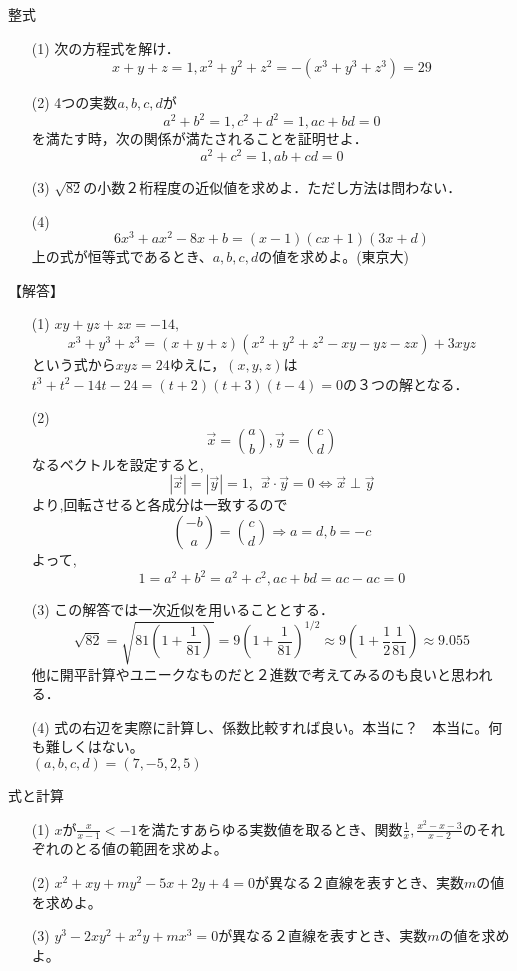 \documentclass[a4paper,fleqn,dvipdfmx]{jsarticle}
\begin{document}
\newpage
\begin{itembox}[l]{整式}
\begin{itemize}
    \item [(1)] 次の方程式を解け．
    $$x+y+z=1,x^2+y^2+z^2=-(x^3+y^3+z^3)=29$$
    \item [(2)] 4つの実数$a,b,c,d$が
    $$a^2+b^2=1,c^2+d^2=1,ac+bd=0$$
    を満たす時，次の関係が満たされることを証明せよ．
    $$a^2+c^2=1,ab+cd=0$$
    \item [(3)] $\sqrt{82}$の小数２桁程度の近似値を求めよ．ただし方法は問わない．
    \item [(4)] $$6x^3+ax^2-8x+b=(x-1)(cx+1)(3x+d)$$
    上の式が恒等式であるとき、$a,b,c,d$の値を求めよ。(東京大)
\end{itemize}
\end{itembox}

\begin{flushleft}
【解答】
\end{flushleft}

\begin{itemize}
    \item [(1)] $xy+yz+zx=-14,$$$x^3+y^3+z^3=(x+y+z)(x^2+y^2+z^2-xy-yz-zx)+3xyz$$という式から$xyz=24$ゆえに，$(x,y,z)$は$t^3+t^2-14t-24=(t+2)(t+3)(t-4)=0$の３つの解となる．
    \item [(2)]  $$\overrightarrow{ x }= { a \choose b }  , \overrightarrow{ y }= { c \choose d }  $$
なるベクトルを設定すると,$$ \left| \overrightarrow{ x } \right|=\left| \overrightarrow{ y } \right|=1,\hspace{5pt}   \overrightarrow{ x }\cdot \overrightarrow{ y }=0 \iff  \overrightarrow{ x }  \perp  \overrightarrow{ y } $$
より,回転させると各成分は一致するので
$${ -b \choose a }={ c \choose d } \Rightarrow a=d,b=-c$$
よって,
$$1=a^2+b^2=a^2+c^2,ac+bd=ac-ac=0$$
    \item [(3)] この解答では一次近似を用いることとする．$$\sqrt{82}=\sqrt{81(1+\frac{1}{81})}=9(1+\frac{1}{81})^{1/2}\approx 9(1+\frac{1}{2}\frac{1}{81}) \approx 9.055$$
    他に開平計算やユニークなものだと２進数で考えてみるのも良いと思われる．
    \item [(4)] 式の右辺を実際に計算し、係数比較すれば良い。本当に？　本当に。何も難しくはない。\\$(a,b,c,d)=(7,-5,2,5)$
\end{itemize}



\newpage
\begin{itembox}[l]{式と計算}
\begin{itemize}
    \item [(1)] $x$が$\frac{x}{x-1}<-1$を満たすあらゆる実数値を取るとき、関数$\frac{1}{x},\frac{x^2-x-3}{x-2}$のそれぞれのとる値の範囲を求めよ。
    \item [(2)] $x^2+xy+my^2-5x+2y+4=0$が異なる２直線を表すとき、実数$m$の値を求めよ。
    \item [(3)] $y^3-2xy^2+x^2y+mx^3=0$が異なる２直線を表すとき、実数$m$の値を求めよ。
\end{itemize}
\end{itembox}
\end{document}
